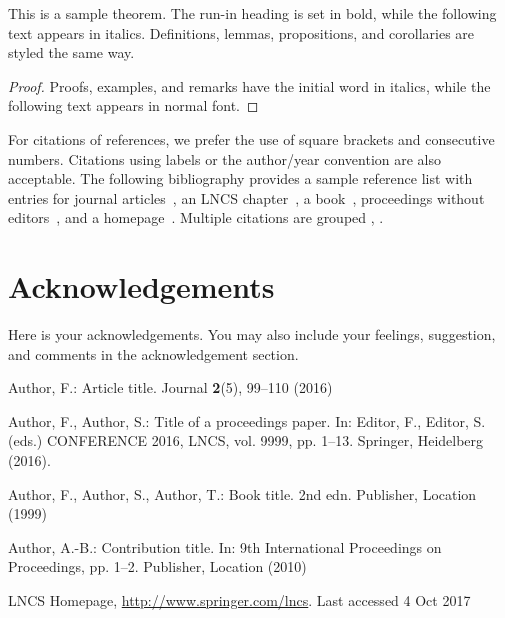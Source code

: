 \documentclass{llncs}
\begin{document}
\begin{theorem}
This is a sample theorem. The run-in heading is set in bold, while
the following text appears in italics. Definitions, lemmas,
propositions, and corollaries are styled the same way.
\end{theorem}
%
%
\begin{proof}
Proofs, examples, and remarks have the initial word in italics,
while the following text appears in normal font.
\end{proof}
For citations of references, we prefer the use of square brackets
and consecutive numbers. Citations using labels or the author/year
convention are also acceptable. The following bibliography provides
a sample reference list with entries for journal
articles~\cite{ref_article1}, an LNCS chapter~\cite{ref_lncs1}, a
book~\cite{ref_book1}, proceedings without editors~\cite{ref_proc1},
and a homepage~\cite{ref_url1}. Multiple citations are grouped
\cite{ref_article1,ref_lncs1,ref_book1},
\cite{ref_article1,ref_book1,ref_proc1,ref_url1}.


\section*{Acknowledgements}

Here is your acknowledgements. You may also include your feelings, suggestion, and comments in the acknowledgement section.

%
%
%
% 
% 
%
\begin{thebibliography}{8}
Author, F.: Article title. Journal \textbf{2}(5), 99--110 (2016)

Author, F., Author, S.: Title of a proceedings paper. In: Editor,
F., Editor, S. (eds.) CONFERENCE 2016, LNCS, vol. 9999, pp. 1--13.
Springer, Heidelberg (2016).

Author, F., Author, S., Author, T.: Book title. 2nd edn. Publisher,
Location (1999)

Author, A.-B.: Contribution title. In: 9th International Proceedings
on Proceedings, pp. 1--2. Publisher, Location (2010)

LNCS Homepage, \url{http://www.springer.com/lncs}. Last accessed 4
Oct 2017
\end{thebibliography}
\end{document}
